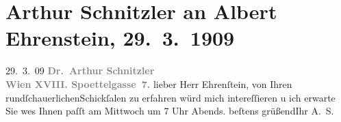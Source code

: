 

         
         \renewcommand{\erwaehntePersonen}{Personen: Albert Ehrenstein}
         \renewcommand{\erwaehnteInstitutionen}{Institutionen: Österreichische Rundschau}
         \renewcommand{\erwaehnteOrte}{Orte: Edmund-Weiß-Gasse, Wien}
         \renewcommand{\erwaehnteWerke}{}
               \section[Arthur Schnitzler an Albert Ehrenstein, 29. 3. 1909]{ Arthur Schnitzler an Albert Ehrenstein, 29. 3. 1909}\nopagebreak{}\rehead{ }\begin{ledgroupsized}[t]{13cm}\normalsize\beginnumbering \toendnotes[C]{\smallbreak\pagebreak[2]} 
\toendnotes[C]{\smallbreak}\pstart
           \raggedleft{}{\pb}29. 3. 09\pend
           \pstart
           \textcolor{gray}{\textbf{Dr. Arthur Schnitzler}}{\\}\textcolor{gray}{\textbf{Wien XVIII. Spoettelgasse 7.}}\pend
           \pstart{}lieber Herr Ehrenſtein,\pend\pstart
           von Ihren rundſchauerlichenSchickſalen zu erfahren würd mich intereſſieren u
               ich erwarte Sie we{\geminationn}s Ihnen paſſt am Mittwoch um 7 Uhr
               Abends.\pend
           \pstart beſtens grüßend\hspace*{1.5em}Ihr \spacefill\mbox{A. S.}\pend{}
         
         \endnumbering{}\end{ledgroupsized}  \newcommand{\dateiname}{L01836}\newcommand{\titel}{Arthur Schnitzler an Albert Ehrenstein, 29. 3. 1909}\newcommand{\editorInnen}{Martin Anton Müller und Gerd-Hermann Susen}
      